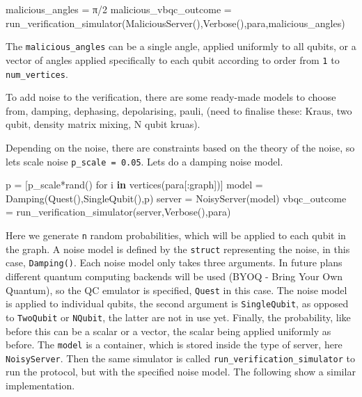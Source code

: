 \documentclass[
]{article}
\newenvironment{Shaded}{}{}
\newcommand{\ConstantTok}[1]{\textcolor[rgb]{0.53,0.00,0.00}{#1}}
\newcommand{\FloatTok}[1]{\textcolor[rgb]{0.25,0.63,0.44}{#1}}
\newcommand{\FunctionTok}[1]{\textcolor[rgb]{0.02,0.16,0.49}{#1}}
\newcommand{\KeywordTok}[1]{\textcolor[rgb]{0.00,0.44,0.13}{\textbf{#1}}}
\newcommand{\NormalTok}[1]{#1}
\newcommand{\OperatorTok}[1]{\textcolor[rgb]{0.40,0.40,0.40}{#1}}
\begin{document}
\begin{Shaded}
\begin{Highlighting}[]
\NormalTok{    malicious\_angles }\OperatorTok{=} \ConstantTok{π}\OperatorTok{/}\FloatTok{2}
\NormalTok{    malicious\_vbqc\_outcome }\OperatorTok{=} \FunctionTok{run\_verification\_simulator}\NormalTok{(}\FunctionTok{MaliciousServer}\NormalTok{(),}\FunctionTok{Verbose}\NormalTok{(),para,malicious\_angles)}
\end{Highlighting}
\end{Shaded}

The \texttt{malicious\_angles} can be a single angle, applied uniformly
to all qubits, or a vector of angles applied specifically to each qubit
according to order from \texttt{1} to \texttt{num\_vertices}.

To add noise to the verification, there are some ready-made models to
choose from, damping, dephasing, depolarising, pauli, (need to finalise
these: Kraus, two qubit, density matrix mixing, N qubit kruas).

Depending on the noise, there are constraints based on the theory of the
noise, so lets scale noise \texttt{p\_scale\ =\ 0.05}. Lets do a damping
noise model.

\begin{Shaded}
\begin{Highlighting}[]
\NormalTok{    p }\OperatorTok{=}\NormalTok{ [}\FunctionTok{p\_scale*rand}\NormalTok{() for i }\KeywordTok{in} \FunctionTok{vertices}\NormalTok{(para[}\OperatorTok{:}\NormalTok{graph])]}
\NormalTok{    model }\OperatorTok{=} \FunctionTok{Damping}\NormalTok{(}\FunctionTok{Quest}\NormalTok{(),}\FunctionTok{SingleQubit}\NormalTok{(),p)}
\NormalTok{    server }\OperatorTok{=} \FunctionTok{NoisyServer}\NormalTok{(model)}
\NormalTok{    vbqc\_outcome }\OperatorTok{=} \FunctionTok{run\_verification\_simulator}\NormalTok{(server,}\FunctionTok{Verbose}\NormalTok{(),para)}
\end{Highlighting}
\end{Shaded}

Here we generate \texttt{n} random probabilities, which will be applied
to each qubit in the graph. A noise model is defined by the
\texttt{struct} representing the noise, in this case,
\texttt{Damping()}. Each noise model only takes three arguments. In
future plans different quantum computing backends will be used (BYOQ -
Bring Your Own Quantum), so the QC emulator is specified, \texttt{Quest}
in this case. The noise model is applied to individual qubits, the
second argument is \texttt{SingleQubit}, as opposed to \texttt{TwoQubit}
or \texttt{NQubit}, the latter are not in use yet. Finally, the
probability, like before this can be a scalar or a vector, the scalar
being applied uniformly as before. The \texttt{model} is a container,
which is stored inside the type of server, here \texttt{NoisyServer}.
Then the same simulator is called \texttt{run\_verification\_simulator}
to run the protocol, but with the specified noise model. The following
show a similar implementation.
\end{document}
